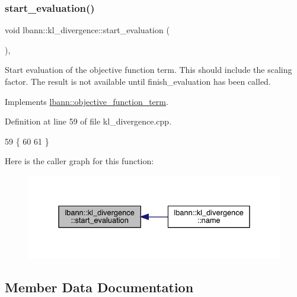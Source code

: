 \mbox{\label{classlbann_1_1kl__divergence_a0a77c724ff9b918e2c2eaf3944f50ac5}} 
\subsubsection{\texorpdfstring{start\+\_\+evaluation()}{start\_evaluation()}}
{\footnotesize\ttfamily void lbann\+::kl\+\_\+divergence\+::start\+\_\+evaluation (\begin{DoxyParamCaption}{ }\end{DoxyParamCaption})\hspace{0.3cm}{\ttfamily [override]}, {\ttfamily [virtual]}}

Start evaluation of the objective function term. This should include the scaling factor. The result is not available until finish\+\_\+evaluation has been called. 

Implements \hyperlink{classlbann_1_1objective__function__term_a0af4dfd71fb30e43d1ae7611172ad9b0}{lbann\+::objective\+\_\+function\+\_\+term}.



Definition at line 59 of file kl\+\_\+divergence.\+cpp.


\begin{DoxyCode}
59                                      \{
60 
61 \}
\end{DoxyCode}
Here is the caller graph for this function\+:\nopagebreak
\begin{figure}[H]
\begin{center}
\leavevmode
\includegraphics[width=331pt]{classlbann_1_1kl__divergence_a0a77c724ff9b918e2c2eaf3944f50ac5_icgraph}
\end{center}
\end{figure}


\subsection{Member Data Documentation}
\mbox{\label{classlbann_1_1kl__divergence_aae1f6deb97728e09771840f447a571b1}} 
